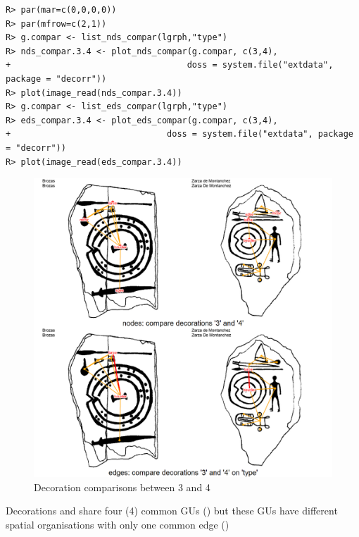 \documentclass[article]{jss}\usepackage{knitr}
\begin{document}
\begin{kframe}
\begin{verbatim}
R> par(mar=c(0,0,0,0))
R> par(mfrow=c(2,1))
R> g.compar <- list_nds_compar(lgrph,"type")
R> nds_compar.3.4 <- plot_nds_compar(g.compar, c(3,4),
+                                   doss = system.file("extdata", package = "decorr"))
R> plot(image_read(nds_compar.3.4))
R> g.compar <- list_eds_compar(lgrph,"type")
R> eds_compar.3.4 <- plot_eds_compar(g.compar, c(3,4),
+                               doss = system.file("extdata", package = "decorr"))
R> plot(image_read(eds_compar.3.4))
\end{verbatim}
\end{kframe}\begin{figure}[H]

{\centering \includegraphics[width=\maxwidth]{figure/unnamed-chunk-17-1} 

}

\caption{\label{fig:figs}Decoration comparisons between 3 and 4}\label{fig:unnamed-chunk-17}
\end{figure}



Decorations  and  share four (4) common GUs () but  these GUs have different spatial organisations with only one common edge ()
\end{document}
